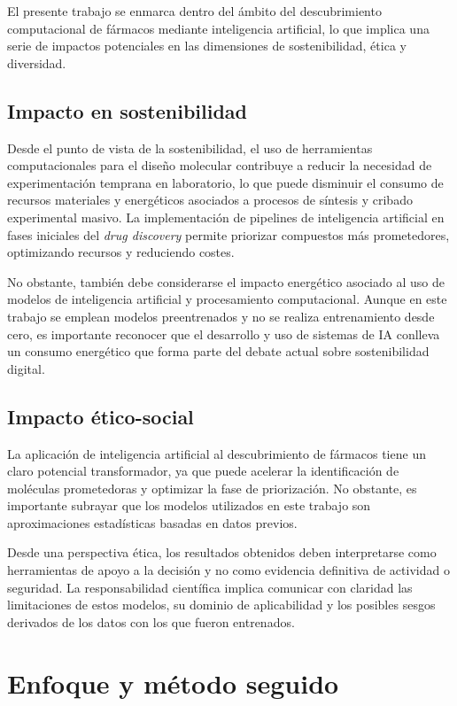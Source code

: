 \documentclass[IB]{TFUOC}%
\begin{document}
El presente trabajo se enmarca dentro del ámbito del descubrimiento computacional de fármacos mediante inteligencia artificial, lo que implica una serie de impactos potenciales en las dimensiones de sostenibilidad, ética y diversidad.

\subsection*{Impacto en sostenibilidad}

Desde el punto de vista de la sostenibilidad, el uso de herramientas computacionales para el diseño molecular contribuye a reducir la necesidad de experimentación temprana en laboratorio, lo que puede disminuir el consumo de recursos materiales y energéticos asociados a procesos de síntesis y cribado experimental masivo. La implementación de pipelines de inteligencia artificial en fases iniciales del \textit{drug discovery} permite priorizar compuestos más prometedores, optimizando recursos y reduciendo costes.

No obstante, también debe considerarse el impacto energético asociado al uso de modelos de inteligencia artificial y procesamiento computacional. Aunque en este trabajo se emplean modelos preentrenados y no se realiza entrenamiento desde cero, es importante reconocer que el desarrollo y uso de sistemas de IA conlleva un consumo energético que forma parte del debate actual sobre sostenibilidad digital.

\subsection*{Impacto ético-social}

La aplicación de inteligencia artificial al descubrimiento de fármacos tiene un claro potencial transformador, ya que puede acelerar la identificación de moléculas prometedoras y optimizar la fase de priorización. No obstante, es importante subrayar que los modelos utilizados en este trabajo son aproximaciones estadísticas basadas en datos previos.

Desde una perspectiva ética, los resultados obtenidos deben interpretarse como herramientas de apoyo a la decisión y no como evidencia definitiva de actividad o seguridad. La responsabilidad científica implica comunicar con claridad las limitaciones de estos modelos, su dominio de aplicabilidad y los posibles sesgos derivados de los datos con los que fueron entrenados.

\section{Enfoque y método seguido}
\end{document}
